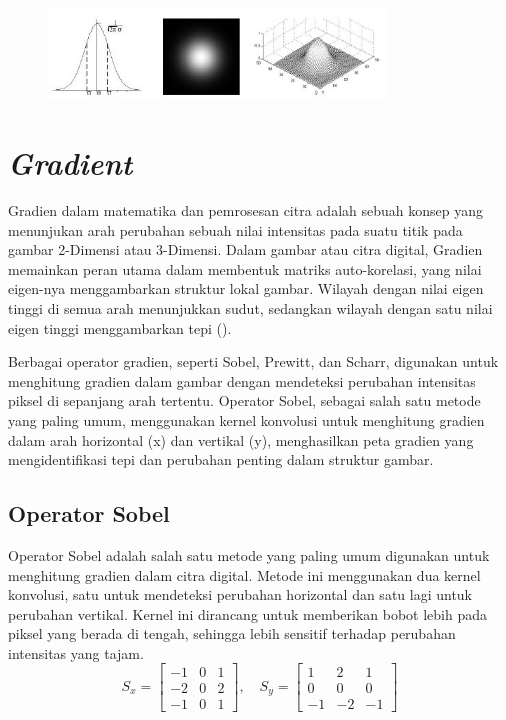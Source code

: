 \begin{figure}
  \centering{}
  \includegraphics[width=0.8\textwidth]{gambar/Uniform Gaussian kernel.jpg}
  \caption{}
\end{figure}

\section{\emph{Gradient}}
  Gradien dalam matematika dan pemrosesan citra adalah sebuah konsep yang menunjukan arah perubahan sebuah nilai intensitas pada suatu titik pada gambar 2-Dimensi atau 3-Dimensi. 
Dalam gambar atau citra digital, Gradien memainkan peran utama dalam membentuk matriks auto-korelasi, yang nilai eigen-nya menggambarkan struktur lokal gambar. 
Wilayah dengan nilai eigen tinggi di semua arah menunjukkan sudut, sedangkan wilayah dengan satu nilai eigen tinggi menggambarkan tepi (\cite[hlm. 305--306]{Sanchez2018}).

  Berbagai operator gradien, seperti Sobel, Prewitt, dan Scharr, digunakan untuk menghitung gradien dalam gambar dengan mendeteksi perubahan intensitas piksel di sepanjang arah tertentu. 
Operator Sobel, sebagai salah satu metode yang paling umum, menggunakan kernel konvolusi untuk menghitung gradien dalam arah horizontal (x) dan vertikal (y), menghasilkan peta gradien yang mengidentifikasi tepi dan perubahan penting dalam struktur gambar.
\subsection{Operator Sobel}
  Operator Sobel adalah salah satu metode yang paling umum digunakan untuk menghitung gradien dalam citra digital. Metode ini menggunakan dua kernel konvolusi, satu untuk mendeteksi perubahan horizontal dan satu lagi untuk perubahan vertikal. Kernel ini dirancang untuk memberikan bobot lebih pada piksel yang berada di tengah, sehingga lebih sensitif terhadap perubahan intensitas yang tajam.
\begin{equation}
  S_x = \begin{bmatrix}
    -1 & 0 & 1 \\
    -2 & 0 & 2 \\
    -1 & 0 & 1
  \end{bmatrix}, \quad
  S_y = \begin{bmatrix}
    1 & 2 & 1 \\
    0 & 0 & 0 \\
    -1 & -2 & -1
  \end{bmatrix}
\end{equation}

